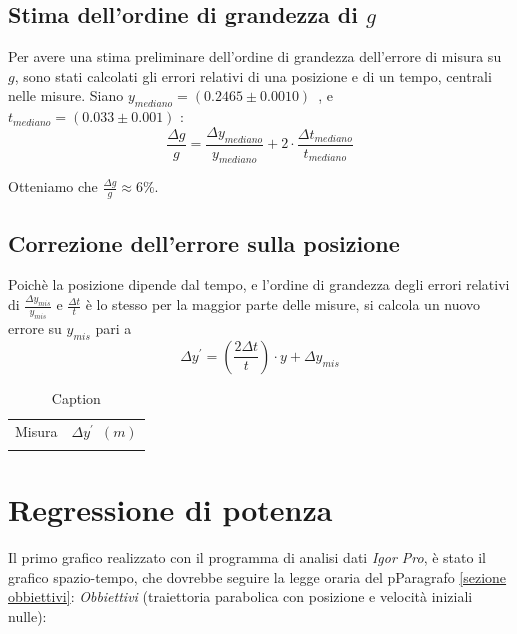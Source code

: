 \documentclass[12pt, a4paper]{article}
\begin{document}
\subsection{Stima dell'ordine di grandezza di $g$}
Per avere una stima preliminare dell'ordine di grandezza dell'errore di misura su $g$, sono stati calcolati gli errori relativi di una posizione e di un tempo, centrali nelle misure. Siano $y_{mediano}=(0.2465\pm0.0010)$\ , e \ $t_{mediano}=(0.033\pm0.001)$ :
\begin{equation*}
    \frac{\Delta g}{g}=\frac{\Delta y_{mediano}}{y_{mediano}}+2\cdot \frac{\Delta t_{mediano}}{t_{mediano}}
\end{equation*}

Otteniamo che $\displaystyle\frac{\Delta g}{g}\approx 6\%$.\bigskip\\
\subsection{Correzione dell'errore sulla posizione}
Poichè la posizione dipende dal tempo, e l'ordine di grandezza degli errori relativi di
$\displaystyle{\frac{\Delta y_{mis}}{y_{mis}}}$ e $\displaystyle{\frac{\Delta t}{t}}$ è lo stesso per la maggior parte delle misure, si calcola un nuovo errore su $y_{mis}$ pari a 
\begin{equation*}
   \Delta y^{'} = \left(\frac{2\Delta t}{t}\right)\cdot y + \Delta y_{mis}
\end{equation*}

\begin{table}[!h]
    \centering
    \begin{tabular}{|c|c|}
    \hline
    \multirow{2}{*}{\small Misura} 
    &\multirow{2}{*}{\small$\Delta y^{'}$\ $(m)$} 
     
    \\
    & 
    \\
    \hline
    \hline
       &   \\
    \hline
    \end{tabular}
        \caption{Caption}
        \label{tab:errore ymis corretto inizio}
\end{table}



\section{Regressione di potenza} \label{Agg. misure xconcl}
Il primo grafico realizzato con il programma di analisi dati \textit{Igor Pro}, è stato il grafico spazio-tempo, che dovrebbe seguire la legge oraria del pParagrafo \ref{sezione obbiettivi}: \textit{Obbiettivi} (traiettoria parabolica con posizione e velocità iniziali nulle): 
\end{document}
